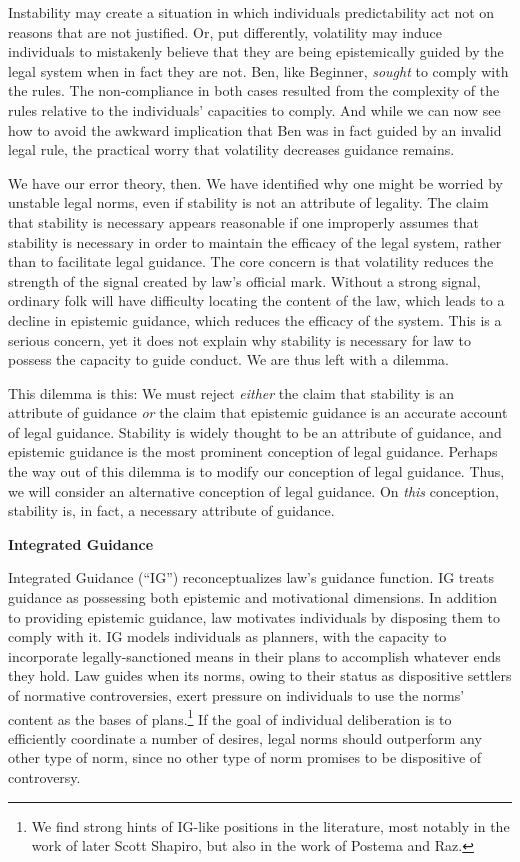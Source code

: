 Instability may create a situation in which individuals predictability
act not on reasons that are not justified. Or, put differently,
volatility may induce individuals to mistakenly believe that they are
being epistemically guided by the legal system when in fact they are
not. Ben, like Beginner, \emph{sought} to comply with the rules. The
non-compliance in both cases resulted from the complexity of the rules
relative to the individuals' capacities to comply. And while we can now
see how to avoid the awkward implication that Ben was in fact guided by
an invalid legal rule, the practical worry that volatility decreases
guidance remains.

We have our error theory, then. We have identified why one might be
worried by unstable legal norms, even if stability is not an attribute
of legality. The claim that stability is necessary appears reasonable if
one improperly assumes that stability is necessary in order to maintain
the efficacy of the legal system, rather than to facilitate legal
guidance. The core concern is that volatility reduces the strength of
the signal created by law's official mark. Without a strong signal,
ordinary folk will have difficulty locating the content of the law,
which leads to a decline in epistemic guidance, which reduces the
efficacy of the system. This is a serious concern, yet it does not
explain why stability is necessary for law to possess the capacity to
guide conduct. We are thus left with a dilemma.

This dilemma is this: We must reject \emph{either} the claim that
stability is an attribute of guidance \emph{or} the claim that epistemic
guidance is an accurate account of legal guidance. Stability is widely
thought to be an attribute of guidance, and epistemic guidance is the
most prominent conception of legal guidance. Perhaps the way out of this
dilemma is to modify our conception of legal guidance. Thus, we will
consider an alternative conception of legal guidance. On \emph{this}
conception, stability is, in fact, a necessary attribute of guidance.

\textbf{Integrated Guidance}

Integrated Guidance (``IG'') reconceptualizes law's guidance function.
IG treats guidance as possessing both epistemic and motivational
dimensions. In addition to providing epistemic guidance, law motivates
individuals by disposing them to comply with it. IG models individuals
as planners, with the capacity to incorporate legally-sanctioned means
in their plans to accomplish whatever ends they hold. Law guides when
its norms, owing to their status as dispositive settlers of normative
controversies, exert pressure on individuals to use the norms' content
as the bases of plans.\footnote{We find strong hints of IG-like
  positions in the literature, most notably in the work of later Scott
  Shapiro, but also in the work of Postema and Raz.} If the goal of
individual deliberation is to efficiently coordinate a number of
desires, legal norms should outperform any other type of norm, since no
other type of norm promises to be dispositive of controversy.

